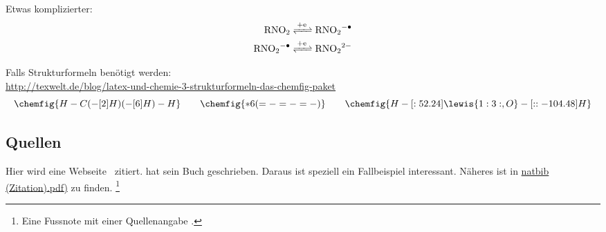 Etwas komplizierter:
\begin{align*}
  \ce{RNO2 &<=>[+e] RNO2^{-.} \\
       RNO2^{-.} &<=>[+e] RNO2^2-}
\end{align*}

Falls Strukturformeln benötigt werden:\\
\url{http://texwelt.de/blog/latex-und-chemie-3-strukturformeln-das-chemfig-paket}
\begin{equation}
\chemfig{H-C(-[2]H)(-[6]H)-H} \quad\quad \chemfig{*6(=-=-=-)} \quad\quad \chemfig{H-[:52.24]\lewis{1:3:,O}-[::-104.48]H}
\end{equation}

\subsection*{Quellen}

Hier wird eine Webseite~\citep{maKSA} zitiert. \citep{Theis2014} hat sein Buch geschrieben. Daraus ist speziell ein Fallbeispiel \citep[siehe][Seite 32]{Theis2014} interessant. Näheres ist in \href{run:../Dokumentationen/natbib(Zitationen).pdf}{\ttfamily natbib (Zitation).pdf)} zu finden. \footnote{Eine Fussnote mit einer Quellenangabe \citep[siehe][Seite 32]{Theis2014}.}

